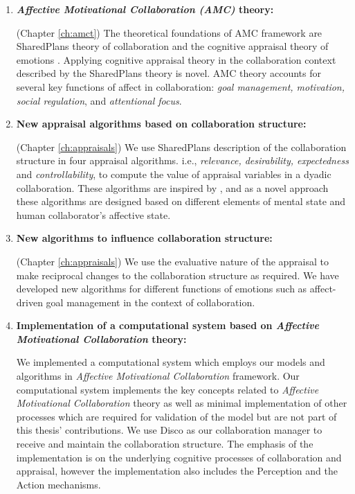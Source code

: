 \documentclass[12pt]{report}
\begin{document}
\begin{enumerate}
  \item \textbf{\textit{Affective Motivational Collaboration (AMC)} theory:}
    
  	(Chapter \ref{ch:amct}) The theoretical foundations of AMC framework are
  	SharedPlans theory of collaboration
  	\cite{grosz:collaboration,grosz:plans-discourse} and the cognitive appraisal
  	theory of emotions \cite{marsella:ema-process-model}
  	\cite{scherer:appraisal-processes}. Applying cognitive appraisal theory in
  	the collaboration context described by the SharedPlans theory is novel. AMC
  	theory accounts for several key functions of affect in collaboration:
  	\textit{goal management, motivation, social regulation}, and
  	\textit{attentional focus}.
	
  \item \textbf{New appraisal algorithms based on collaboration structure:}
  
	(Chapter \ref{ch:appraisals}) We use SharedPlans description of the
	collaboration structure in four appraisal algorithms. i.e., \textit{relevance,
	desirability, expectedness} and \textit{controllability}, to compute the value
	of appraisal variables in a dyadic collaboration. These algorithms are inspired
	by \cite{marsella:ema-process-model}, and as a novel approach these algorithms
	are designed based on different elements of mental state and human
	collaborator's affective state.
	
  \item \textbf{New algorithms to influence collaboration structure:}
   
  (Chapter \ref{ch:appraisals}) We use the evaluative nature of the appraisal to
  make reciprocal changes to the collaboration structure as required. We have
  developed new algorithms for different functions of emotions such as
  affect-driven goal management in the context of collaboration.
  
  \item \textbf{Implementation of a computational system based on
  \textit{Affective Motivational Collaboration} theory:}

  We implemented a computational system which employs our models and algorithms
  in \textit{Affective Motivational Collaboration} framework. Our computational
  system implements the key concepts related to \textit{Affective Motivational
  Collaboration} theory as well as minimal implementation of other processes
  which are required for validation of the model but are not part of this
  thesis' contributions. We use Disco as our collaboration manager to receive
  and maintain the collaboration structure. The emphasis of the implementation
  is on the underlying cognitive processes of collaboration and appraisal,
  however the implementation also includes the Perception and the Action
  mechanisms.
  

\end{enumerate}
\end{document}
